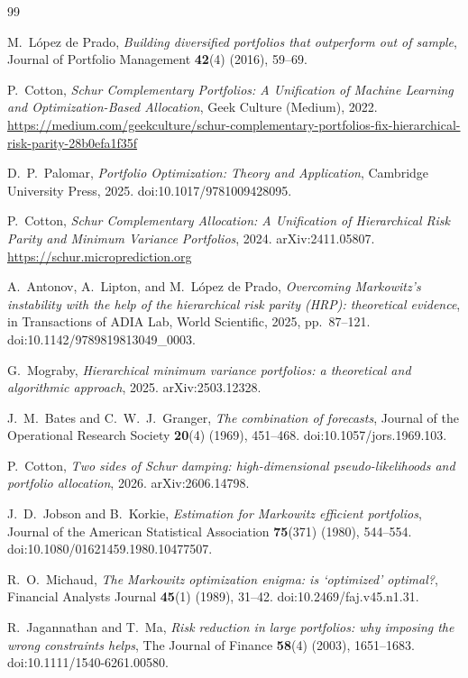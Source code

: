 \documentclass[11pt]{article}
\theoremstyle{remark}
\begin{document}
\begin{thebibliography}{99}

M.~L\'opez de Prado,
\emph{Building diversified portfolios that outperform out of sample},
Journal of Portfolio Management \textbf{42}(4) (2016), 59--69.

P.~Cotton,
\emph{Schur Complementary Portfolios: A Unification of Machine Learning
and Optimization-Based Allocation},
Geek Culture (Medium), 2022.
\url{https://medium.com/geekculture/schur-complementary-portfolios-fix-hierarchical-risk-parity-28b0efa1f35f}

D.~P.~Palomar,
\emph{Portfolio Optimization: Theory and Application},
Cambridge University Press, 2025. doi:10.1017/9781009428095.

P.~Cotton,
\emph{Schur Complementary Allocation: A Unification of Hierarchical Risk
Parity and Minimum Variance Portfolios}, 2024.
arXiv:2411.05807. \url{https://schur.microprediction.org}

A.~Antonov, A.~Lipton, and M.~L\'opez de Prado,
\emph{Overcoming Markowitz's instability with the help of the hierarchical
risk parity (HRP): theoretical evidence},
in Transactions of ADIA Lab, World Scientific, 2025, pp.~87--121.
doi:10.1142/9789819813049\_0003.

G.~Mograby,
\emph{Hierarchical minimum variance portfolios: a theoretical and algorithmic
approach}, 2025. arXiv:2503.12328.

J.~M.~Bates and C.~W.~J.~Granger,
\emph{The combination of forecasts},
Journal of the Operational Research Society \textbf{20}(4) (1969),
451--468. doi:10.1057/jors.1969.103.

P.~Cotton,
\emph{Two sides of Schur damping: high-dimensional pseudo-likelihoods and
portfolio allocation}, 2026. arXiv:2606.14798.

J.~D.~Jobson and B.~Korkie,
\emph{Estimation for Markowitz efficient portfolios},
Journal of the American Statistical Association \textbf{75}(371) (1980),
544--554. doi:10.1080/01621459.1980.10477507.

R.~O.~Michaud,
\emph{The Markowitz optimization enigma: is `optimized' optimal?},
Financial Analysts Journal \textbf{45}(1) (1989), 31--42.
doi:10.2469/faj.v45.n1.31.

R.~Jagannathan and T.~Ma,
\emph{Risk reduction in large portfolios: why imposing the wrong constraints
helps},
The Journal of Finance \textbf{58}(4) (2003), 1651--1683.
doi:10.1111/1540-6261.00580.


\end{thebibliography}
\end{document}
